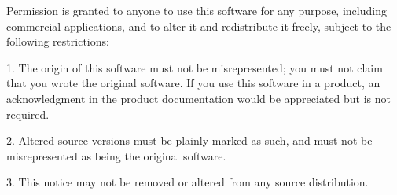 Permission is granted to anyone to use this software for any purpose, including commercial applications, and to alter it and redistribute it freely, subject to the following restrictions:

1. The origin of this software must not be misrepresented; you must not claim that you wrote the original software. If you use this software in a product, an acknowledgment in the product documentation would be appreciated but is not required.

2. Altered source versions must be plainly marked as such, and must not be misrepresented as being the original software.

3. This notice may not be removed or altered from any source distribution. 